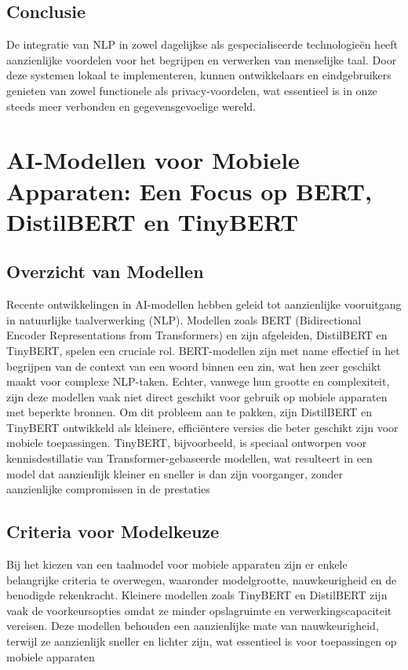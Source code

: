 \subsection{Conclusie}

De integratie van NLP in zowel dagelijkse als gespecialiseerde technologieën heeft aanzienlijke voordelen voor het begrijpen en verwerken van menselijke taal. Door deze systemen lokaal te implementeren, kunnen ontwikkelaars en eindgebruikers genieten van zowel functionele als privacy-voordelen, wat essentieel is in onze steeds meer verbonden en gegevensgevoelige wereld.

\section{AI-Modellen voor Mobiele Apparaten: Een Focus op BERT, DistilBERT en TinyBERT}

\subsection{Overzicht van Modellen}

Recente ontwikkelingen in AI-modellen hebben geleid tot aanzienlijke vooruitgang in natuurlijke taalverwerking (NLP). Modellen zoals BERT (Bidirectional Encoder Representations from Transformers) en zijn afgeleiden, DistilBERT en TinyBERT, spelen een cruciale rol. BERT-modellen zijn met name effectief in het begrijpen van de context van een woord binnen een zin, wat hen zeer geschikt maakt voor complexe NLP-taken. Echter, vanwege hun grootte en complexiteit, zijn deze modellen vaak niet direct geschikt voor gebruik op mobiele apparaten met beperkte bronnen. Om dit probleem aan te pakken, zijn DistilBERT en TinyBERT ontwikkeld als kleinere, efficiëntere versies die beter geschikt zijn voor mobiele toepassingen. TinyBERT, bijvoorbeeld, is speciaal ontworpen voor kennisdestillatie van Transformer-gebaseerde modellen, wat resulteert in een model dat aanzienlijk kleiner en sneller is dan zijn voorganger, zonder aanzienlijke compromissen in de prestaties \autocite{Jiao2019TinyBERT}

\subsection{Criteria voor Modelkeuze}

Bij het kiezen van een taalmodel voor mobiele apparaten zijn er enkele belangrijke criteria te overwegen, waaronder modelgrootte, nauwkeurigheid en de benodigde rekenkracht. Kleinere modellen zoals TinyBERT en DistilBERT zijn vaak de voorkeursopties omdat ze minder opslagruimte en verwerkingscapaciteit vereisen. Deze modellen behouden een aanzienlijke mate van nauwkeurigheid, terwijl ze aanzienlijk sneller en lichter zijn, wat essentieel is voor toepassingen op mobiele apparaten \autocite{Sun2020MobileBERT}

